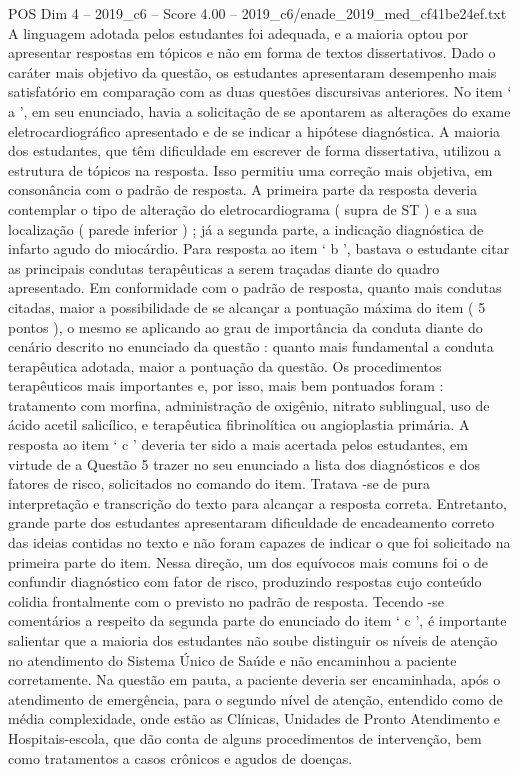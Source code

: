 \begin{textsample}{POS Dim 4 – 2019\_c6 – Score 4.00 – 2019\_c6/enade\_2019\_med\_cf41be24ef.txt}
A linguagem adotada pelos estudantes foi adequada, e a maioria optou por apresentar respostas em tópicos e não em forma de textos dissertativos.
Dado o caráter mais objetivo da questão, os estudantes apresentaram desempenho mais satisfatório em comparação com as duas questões discursivas anteriores.
No item ‘ a ’, em seu enunciado, havia a solicitação de se apontarem as alterações do exame eletrocardiográfico apresentado e de se indicar a hipótese diagnóstica.
A maioria dos estudantes, que têm dificuldade em escrever de forma dissertativa, utilizou a estrutura de tópicos na resposta.
Isso permitiu uma correção mais objetiva, em consonância com o padrão de resposta.
A primeira parte da resposta deveria contemplar o tipo de alteração do eletrocardiograma ( supra de ST ) e a sua localização ( parede inferior ) ; já a segunda parte, a indicação diagnóstica de infarto agudo do miocárdio.
Para resposta ao item ‘ b ’, bastava o estudante citar as principais condutas terapêuticas a serem traçadas diante do quadro apresentado.
Em conformidade com o padrão de resposta, quanto mais condutas citadas, maior a possibilidade de se alcançar a pontuação máxima do item ( 5 pontos ), o mesmo se aplicando ao grau de importância da conduta diante do cenário descrito no enunciado da questão : quanto mais fundamental a conduta terapêutica adotada, maior a pontuação da questão.
Os procedimentos terapêuticos mais importantes e, por isso, mais bem pontuados foram : tratamento com morfina, administração de oxigênio, nitrato sublingual, uso de ácido acetil salicílico, e terapêutica fibrinolítica ou angioplastia primária.
A resposta ao item ‘ c ’ deveria ter sido a mais acertada pelos estudantes, em virtude de a Questão 5 trazer no seu enunciado a lista dos diagnósticos e dos fatores de risco, solicitados no comando do item.
Tratava -se de pura interpretação e transcrição do texto para alcançar a resposta correta.
Entretanto, grande parte dos estudantes apresentaram dificuldade de encadeamento correto das ideias contidas no texto e não foram capazes de indicar o que foi solicitado na primeira parte do item.
Nessa direção, um dos equívocos mais comuns foi o de confundir diagnóstico com fator de risco, produzindo respostas cujo conteúdo colidia frontalmente com o previsto no padrão de resposta.
Tecendo -se comentários a respeito da segunda parte do enunciado do item ‘ c ’, é importante salientar que a maioria dos estudantes não soube distinguir os níveis de atenção no atendimento do Sistema Único de Saúde e não encaminhou a paciente corretamente.
Na questão em pauta, a paciente deveria ser encaminhada, após o atendimento de emergência, para o segundo nível de atenção, entendido como de média complexidade, onde estão as Clínicas, Unidades de Pronto Atendimento e Hospitais-escola, que dão conta de alguns procedimentos de intervenção, bem como tratamentos a casos crônicos e agudos de doenças.

\end{textsample}

